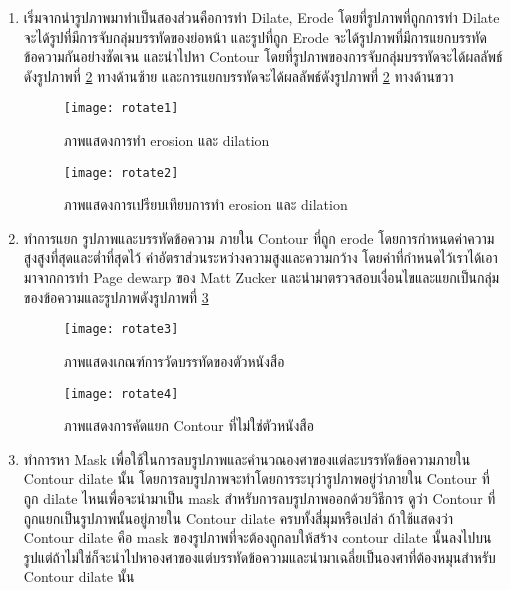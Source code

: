 \begin{enumerate}
    \item เริ่มจากนำรูปภาพมาทำเป็นสองส่วนคือการทำ Dilate, Erode โดยที่รูปภาพที่ถูกการทำ Dilate จะได้รูปที่มีการจับกลุ่มบรรทัดของย่อหน้า และรูปที่ถูก Erode จะได้รูปภาพที่มีการแยกบรรทัดข้อความกันอย่างชัดเจน และนำไปหา Contour โดยที่รูปภาพของการจับกลุ่มบรรทัดจะได้ผลลัพธ์ดังรูปภาพที่ \ref{fig:rotate2} ทางด้านซ้าย และการแยกบรรทัดจะได้ผลลัพธ์ดังรูปภาพที่ \ref{fig:rotate2} ทางด้านขวา 
    
    \begin{figure}[H]
        \centering
        \texttt{[image: rotate1]}
        \caption{ภาพแสดงการทำ erosion และ dilation}\label{fig:rotate1}
    \end{figure}
    
    \begin{figure}[H]
        \centering
        \texttt{[image: rotate2]}
        \caption{ภาพแสดงการเปรียบเทียบการทำ erosion และ dilation}\label{fig:rotate2}
    \end{figure}

    \item ทำการแยก รูปภาพและบรรทัดข้อความ ภายใน Contour ที่ถูก erode โดยการกำหนดค่าความสูงสูงที่สุดและต่ำที่สุดไว้ ค่าอัตราส่วนระหว่างความสูงและความกว้าง โดยค่าที่กำหนดไว้เราได้เอามาจากการทำ Page dewarp ของ Matt Zucker \cite{mattzuck} และนำมาตรวจสอบเงื่อนไขและแยกเป็นกลุ่มของข้อความและรูปภาพดังรูปภาพที่ \ref{fig:rotate3}
    
    \begin{figure}[H]
        \centering
        \texttt{[image: rotate3]}
        \caption{ภาพแสดงเกณฑ์การวัดบรรทัดของตัวหนังสือ}\label{fig:rotate3}
    \end{figure}
    
    \begin{figure}[H]
        \centering
        \texttt{[image: rotate4]}
        \caption{ภาพแสดงการคัดแยก Contour ที่ไม่ใช่ตัวหนังสือ}\label{fig:rotate4}
    \end{figure}

    \item ทำการหา Mask เพื่อใช้ในการลบรูปภาพและคำนวณองศาของแต่ละบรรทัดข้อความภายใน Contour dilate นั้น โดยการลบรูปภาพจะทำโดยการระบุว่ารูปภาพอยู่ว่าภายใน Contour ที่ถูก dilate ไหนเพื่อจะนำมาเป็น mask สำหรับการลบรูปภาพออกด้วยวิธีการ ดูว่า Contour ที่ถูกแยกเป็นรูปภาพนั้นอยู่ภายใน Contour dilate ครบทั้งสี่มุมหรือเปล่า ถ้าใช้แสดงว่า Contour dilate คือ mask ของรูปภาพที่จะต้องถูกลบให้สร้าง contour dilate นั้นลงไปบนรูปแต่ถ้าไม่ใช่ก็จะนำไปหาองศาของแต่บรรทัดข้อความและนำมาเฉลี่ยเป็นองศาที่ต้องหมุนสำหรับ Contour dilate นั้น
    

\end{enumerate}
